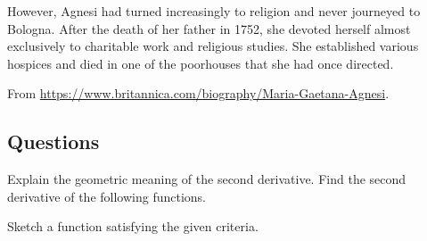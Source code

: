 However, Agnesi had turned increasingly to religion and never journeyed to Bologna. After the death of her father in 1752, she devoted herself almost exclusively to charitable work and religious studies. She established various hospices and died in one of the poorhouses that she had once directed.

\begin{flushright}
  From \url{https://www.britannica.com/biography/Maria-Gaetana-Agnesi}.
\end{flushright}

\subsection*{Questions}
\begin{questions}
  \question Explain the geometric meaning of the second derivative.
  \question Find the second derivative of the following functions.
  \question Sketch a function satisfying the given criteria.
\end{questions}


